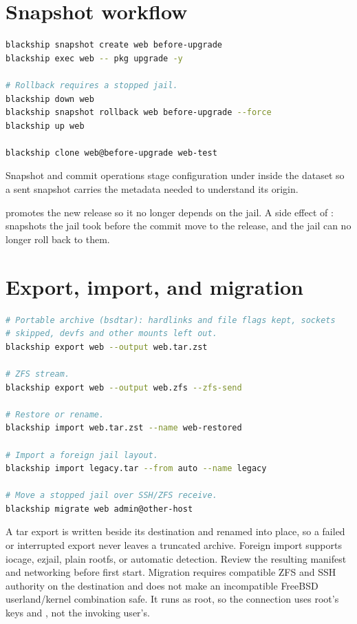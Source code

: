 \section{Snapshot workflow}

\begin{lstlisting}[language=bash]
blackship snapshot create web before-upgrade
blackship exec web -- pkg upgrade -y

# Rollback requires a stopped jail.
blackship down web
blackship snapshot rollback web before-upgrade --force
blackship up web

blackship clone web@before-upgrade web-test
\end{lstlisting}

Snapshot and commit operations stage configuration under 
inside the dataset so a sent snapshot carries the metadata needed to understand
its origin.

 promotes the new release so it no longer depends on the jail.
A side effect of : snapshots the jail took before the
commit move to the release, and the jail can no longer roll back to them.

\section{Export, import, and migration}

\begin{lstlisting}[language=bash]
# Portable archive (bsdtar): hardlinks and file flags kept, sockets
# skipped, devfs and other mounts left out.
blackship export web --output web.tar.zst

# ZFS stream.
blackship export web --output web.zfs --zfs-send

# Restore or rename.
blackship import web.tar.zst --name web-restored

# Import a foreign jail layout.
blackship import legacy.tar --from auto --name legacy

# Move a stopped jail over SSH/ZFS receive.
blackship migrate web admin@other-host
\end{lstlisting}

A tar export is written beside its destination and renamed into place, so a
failed or interrupted export never leaves a truncated archive. Foreign import
supports iocage, ezjail, plain rootfs, or automatic detection.
Review the resulting manifest and networking before first start. Migration
requires compatible ZFS and SSH authority on the destination and does not make
an incompatible FreeBSD userland/kernel combination safe. It runs as root, so
the connection uses root's keys and , not the invoking
user's.

